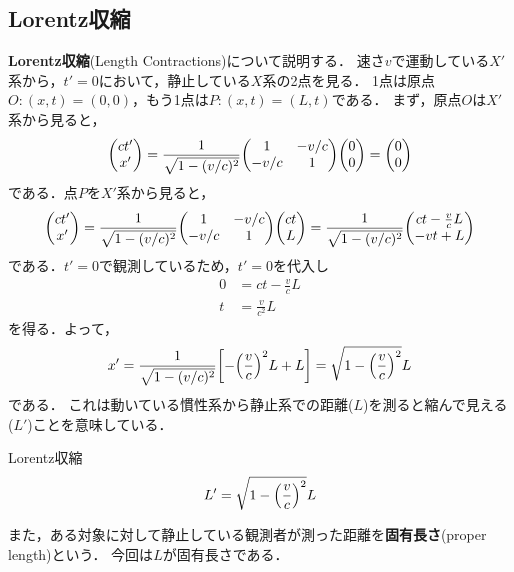 \documentclass{report}
\begin{document}
  \subsection{Lorentz収縮}
    \textbf{Lorentz収縮}(Length Contractions)について説明する．
    速さ$v$で運動している$X'$系から，$t' = 0$において，静止している$X$系の2点を見る．
    1点は原点$O:(x, t) = (0, 0)$，もう1点は$P:(x, t) = (L, t)$である．
    まず，原点$O$は$X'$系から見ると，
    \begin{align}
      \mqty(ct' \\ x')
      =
      \frac{1}{\sqrt{1 - (v/c)^2}}
      \mqty(
        1 & -v/c \\
        -v/c & 1
      )
      \mqty(0 \\ 0)
      =
      \mqty(0 \\ 0)
    \end{align}
    である．点$P$を$X'$系から見ると，
    \begin{align}
      \mqty(ct' \\ x')
      =
      \frac{1}{\sqrt{1 - (v/c)^2}}
      \mqty(
        1 & -v/c\\
        -v/c & 1
      )
      \mqty(ct \\ L)
      =
      \frac{1}{\sqrt{1 - (v/c)^2}}
      \mqty(ct - \frac{v}{c}L \\ -vt + L)
    \end{align}
    である．$t' = 0$で観測しているため，$t' = 0$を代入し
    \begin{align}
      0 &= ct - \frac{v}{c}L \\
      t &= \frac{v}{c^2}L
    \end{align}
    を得る．よって，
    \begin{align}
      x' = \frac{1}{\sqrt{1 - (v/c)^2}} \qty[-\qty(\frac{v}{c})^2 L + L] = \sqrt{1-\qty(\frac{v}{c})^2}L
    \end{align}
    である．
    これは動いている慣性系から静止系での距離($L$)を測ると縮んで見える($L'$)ことを意味している．
    \begin{itembox}[l]{Lorentz収縮}
      \begin{align}
        L' = \sqrt{1 - \qty(\frac{v}{c})^2}L
      \end{align}
    \end{itembox}
    また，ある対象に対して静止している観測者が測った距離を\textbf{固有長さ}(proper length)という．
    今回は$L$が固有長さである．
\end{document}
